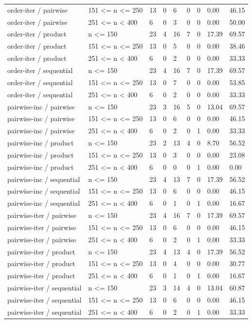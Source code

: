 \begin{tabular}{lllllllll}
order-iter / pairwise & 151 <= n <= 250 & 13 & 0 & 6 & 0 & 0 & 0.00 & 46.15 \\
order-iter / pairwise & 251 <= n < 400 & 6 & 0 & 3 & 0 & 0 & 0.00 & 50.00 \\
order-iter / product & n <= 150 & 23 & 4 & 16 & 7 & 0 & 17.39 & 69.57 \\
order-iter / product & 151 <= n <= 250 & 13 & 0 & 5 & 0 & 0 & 0.00 & 38.46 \\
order-iter / product & 251 <= n < 400 & 6 & 0 & 2 & 0 & 0 & 0.00 & 33.33 \\
order-iter / sequential & n <= 150 & 23 & 4 & 16 & 7 & 0 & 17.39 & 69.57 \\
order-iter / sequential & 151 <= n <= 250 & 13 & 0 & 7 & 0 & 0 & 0.00 & 53.85 \\
order-iter / sequential & 251 <= n < 400 & 6 & 0 & 2 & 0 & 0 & 0.00 & 33.33 \\
pairwise-inc / pairwise & n <= 150 & 23 & 3 & 16 & 5 & 0 & 13.04 & 69.57 \\
pairwise-inc / pairwise & 151 <= n <= 250 & 13 & 0 & 6 & 0 & 0 & 0.00 & 46.15 \\
pairwise-inc / pairwise & 251 <= n < 400 & 6 & 0 & 2 & 0 & 1 & 0.00 & 33.33 \\
pairwise-inc / product & n <= 150 & 23 & 2 & 13 & 4 & 0 & 8.70 & 56.52 \\
pairwise-inc / product & 151 <= n <= 250 & 13 & 0 & 3 & 0 & 0 & 0.00 & 23.08 \\
pairwise-inc / product & 251 <= n < 400 & 6 & 0 & 0 & 0 & 1 & 0.00 & 0.00 \\
pairwise-inc / sequential & n <= 150 & 23 & 4 & 13 & 7 & 0 & 17.39 & 56.52 \\
pairwise-inc / sequential & 151 <= n <= 250 & 13 & 0 & 6 & 0 & 0 & 0.00 & 46.15 \\
pairwise-inc / sequential & 251 <= n < 400 & 6 & 0 & 1 & 0 & 1 & 0.00 & 16.67 \\
pairwise-iter / pairwise & n <= 150 & 23 & 4 & 16 & 7 & 0 & 17.39 & 69.57 \\
pairwise-iter / pairwise & 151 <= n <= 250 & 13 & 0 & 6 & 0 & 0 & 0.00 & 46.15 \\
pairwise-iter / pairwise & 251 <= n < 400 & 6 & 0 & 2 & 0 & 1 & 0.00 & 33.33 \\
pairwise-iter / product & n <= 150 & 23 & 4 & 13 & 4 & 0 & 17.39 & 56.52 \\
pairwise-iter / product & 151 <= n <= 250 & 13 & 0 & 4 & 0 & 0 & 0.00 & 30.77 \\
pairwise-iter / product & 251 <= n < 400 & 6 & 0 & 1 & 0 & 1 & 0.00 & 16.67 \\
pairwise-iter / sequential & n <= 150 & 23 & 3 & 14 & 4 & 0 & 13.04 & 60.87 \\
pairwise-iter / sequential & 151 <= n <= 250 & 13 & 0 & 6 & 0 & 0 & 0.00 & 46.15 \\
pairwise-iter / sequential & 251 <= n < 400 & 6 & 0 & 2 & 0 & 1 & 0.00 & 33.33 \\
\hline
\end{tabular}
